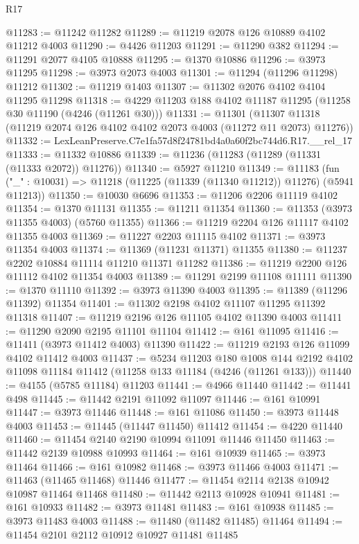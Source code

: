 \begin{lexlean}{R17}
\begin{coremodule}
@11283 := @11242 @11282
@11289 := @11219 @2078 @126 @10889 @4102 @11212 @4003
@11290 := @4426 @11203
@11291 := @11290 @382
@11294 := @11291 @2077 @4105 @10888
@11295 := @1370 @10886
@11296 := @3973 @11295
@11298 := @3973 @2073 @4003
@11301 := @11294 (@11296 @11298) @11212
@11302 := @11219 @1403
@11307 := @11302 @2076 @4102 @4104 @11295 @11298
@11318 := @4229 @11203 @188 @4102 @11187 @11295 (@11258 @30 @11190 (@4246 (@11261 @30)))
@11331 := @11301
    (@11307 @11318 (@11219 @2074 @126 @4102 @4102 @2073 @4003 (@11272 @11 @2073) @11276))
@11332 := LexLeanPreserve.C7e1fa57d8f24781bd4a0a60f2bc744d6.R17.__rel_17
@11333 := @11332 @10886
@11339 := @11236 (@11283 (@11289 (@11331 (@11333 @2072)) @11276))
@11340 := @5927 @11210
@11349 := @11183
    (fun ("_" : @10031) => @11218 (@11225 (@11339 (@11340 @11212)) @11276) (@5941 @11213))
@11350 := @10030 @6696
@11353 := @11206 @2206 @11119 @4102
@11354 := @1370 @11131
@11355 := @11211 @11354
@11360 := @11353 (@3973 @11355 @4003) (@5760 @11355)
@11366 := @11219 @2204 @126 @11117 @4102 @11355 @4003
@11369 := @11227 @2203 @11115 @4102
@11371 := @3973 @11354 @4003
@11374 := @11369 (@11231 @11371) @11355
@11380 := @11237 @2202 @10884 @11114 @11210 @11371 @11282
@11386 := @11219 @2200 @126 @11112 @4102 @11354 @4003
@11389 := @11291 @2199 @11108 @11111
@11390 := @1370 @11110
@11392 := @3973 @11390 @4003
@11395 := @11389 (@11296 @11392) @11354
@11401 := @11302 @2198 @4102 @11107 @11295 @11392 @11318
@11407 := @11219 @2196 @126 @11105 @4102 @11390 @4003
@11411 := @11290 @2090 @2195 @11101 @11104
@11412 := @161 @11095
@11416 := @11411 (@3973 @11412 @4003) @11390
@11422 := @11219 @2193 @126 @11099 @4102 @11412 @4003
@11437 := @5234
    @11203
    @180
    @1008
    @144
    @2192
    @4102
    @11098
    @11184
    @11412
    (@11258 @133 @11184 (@4246 (@11261 @133)))
@11440 := @4155 (@5785 @11184) @11203
@11441 := @4966 @11440
@11442 := @11441 @498
@11445 := @11442 @2191 @11092 @11097
@11446 := @161 @10991
@11447 := @3973 @11446
@11448 := @161 @11086
@11450 := @3973 @11448 @4003
@11453 := @11445 (@11447 @11450) @11412
@11454 := @4220 @11440
@11460 := @11454 @2140 @2190 @10994 @11091 @11446 @11450
@11463 := @11442 @2139 @10988 @10993
@11464 := @161 @10939
@11465 := @3973 @11464
@11466 := @161 @10982
@11468 := @3973 @11466 @4003
@11471 := @11463 (@11465 @11468) @11446
@11477 := @11454 @2114 @2138 @10942 @10987 @11464 @11468
@11480 := @11442 @2113 @10928 @10941
@11481 := @161 @10933
@11482 := @3973 @11481
@11483 := @161 @10938
@11485 := @3973 @11483 @4003
@11488 := @11480 (@11482 @11485) @11464
@11494 := @11454 @2101 @2112 @10912 @10927 @11481 @11485

\end{coremodule}
\end{lexlean}
